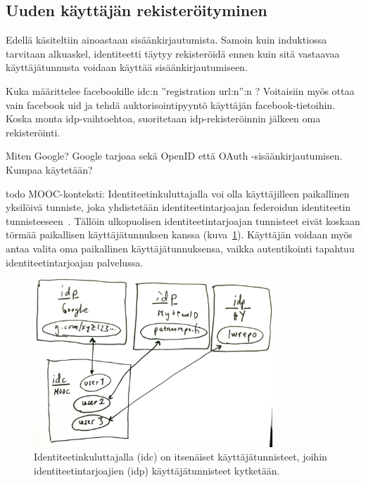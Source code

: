 \documentclass[finnish,gradu]{tktltiki}
\begin{document}


  \subsection{Uuden käyttäjän rekisteröityminen} %
  \label{sub:uuden_käyttäjän_rekisteröityminen}

  Edellä käsiteltiin ainoastaan sisäänkirjautumista. Samoin kuin induktiossa tarvitaan alkuaskel, identiteetti täytyy rekisteröidä ennen kuin sitä vastaavaa käyttäjätunnusta voidaan käyttää sisäänkirjautumiseen.

  Kuka määrittelee facebookille idc:n ''registration url:n'':n ? Voitaisiin myös ottaa vain facebook uid ja tehdä auktorisointipyyntö käyttäjän facebook-tietoihin. Koska monta idp-vaihtoehtoa, suoritetaan idp-rekisteröinnin jälkeen oma rekisteröinti.

  Miten Google? Google tarjoaa sekä OpenID että OAuth -sisäänkirjautumisen. Kumpaa käytetään?

  todo MOOC-konteksti:
  Identiteetinkuluttajalla voi olla käyttäjilleen paikallinen yksilöivä tunniste, joka yhdistetään identiteetintarjoajan federoidun identiteetin tunnisteeseen~\cite{id_delegation_2005}. Tällöin ulkopuolisen identiteetintarjoajan tunnisteet eivät koskaan törmää paikallisen käyttäjätunnuksen kanssa (kuva~\ref{fig:uid_mapping}). Käyttäjän voidaan myös antaa valita oma paikallinen käyttäjätunnuksensa, vaikka autentikointi tapahtuu identiteetintarjoajan palvelussa.
  \begin{figure}
    \centering
    \includegraphics[width=0.8\textwidth]{images/uid_mapping.jpg}
    \caption{Identiteetinkuluttajalla (idc) on itsenäiset käyttäjätunnisteet, joihin identiteetintarjoajien (idp) käyttäjätunnisteet kytketään.}
    \label{fig:uid_mapping}
  \end{figure}
\end{document}
